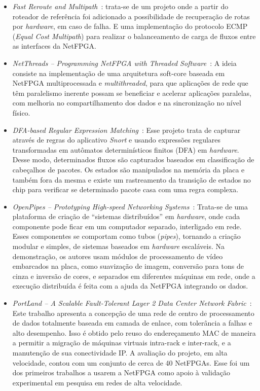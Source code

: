 \begin{itemize}

\item \textit{Fast Reroute and Multipath}~\cite{multipath}: trata-se
de um projeto onde a partir do roteador de referência foi adicionado
a possibilidade de recuperação de rotas por \emph{hardware}, em caso
de falha. E uma implementação do protocolo ECMP (\emph{Equal Cost
Multipath}) para realizar o balanceamento de carga de fluxos entre
as interfaces da NetFPGA.

\item \textit{NetThreads -- Programming NetFPGA with Threaded
Software}~\cite{6645624}: A ideia consiste na implementação de uma
arquitetura soft-core baseada em NetFPGA multiprocessada e
\emph{multithreaded}, para que aplicações de rede que têm
paralelismo inerente possam se beneficiar e acelerar aplicações
paralelas, com melhoria no compartilhamento dos dados e na
sincronização no nível físico.

\item \textit{DFA-based Regular Expression Matching}~\cite{dfa}:
Esse projeto trata de capturar através de regras do aplicativo
\textit{Snort} e usando expressões regulares transformadas em
autômatos determinísticos finitos (DFA) em \textit{hardware}. Desse
modo, determinados fluxos são capturados baseados em classificação
de cabeçalhos de pacotes. Os estados são manipulados na memória da
placa e também fora da mesma e existe um rastreamento da transição
de estados no chip para verificar se determinado pacote casa com uma
regra complexa.

\item \textit{OpenPipes -- Prototyping High-speed Networking
Systems}~\cite{openpipes}: Trata-se de uma plataforma de criação de
``sistemas distribuídos'' em \textit{hardware}, onde cada componente
pode ficar em um computador separado, interligado em rede. Esses
componentes se comportam como tubos (\textit{pipes}), tornando a
criação modular e simples, de sistemas baseados em \textit{hardware}
escaláveis. Na demonstração, os autores usam módulos de
processamento de vídeo embarcados na placa, como suavização de
imagem, conversão para tons de cinza e inversão de cores, e
separados em diferentes máquinas em rede, onde a execução
distribuída é feita com a ajuda da NetFPGA integrando os dados.

\item \textit{PortLand -- A Scalable Fault-Tolerant Layer 2 Data
Center Network
Fabric}~\cite{NiranjanMysore:2009:PSF:1592568.1592575}: Este
trabalho apresenta a concepção de uma rede de centro de
processamento de dados totalmente baseada em camada de enlace, com
tolerância a falhas e alto desempenho. Isso é obtido pelo reuso do
endereçamento MAC de maneira a permitir a migração de máquinas
virtuais intra-rack e inter-rack, e a manutenção de sua
conectividade IP. A avaliação do projeto, em alta velocidade, contou
com um conjunto de cerca de 40 NetFPGAs. Esse foi um dos primeiros
trabalhos a usarem a NetFPGA como apoio à validação experimental em
pesquisa em redes de alta velocidade.


\end{itemize}
